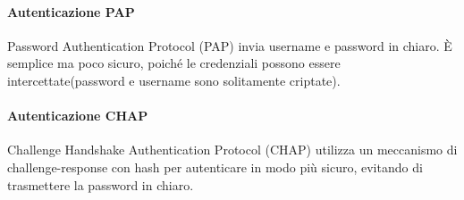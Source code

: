     \paragraph{Autenticazione PAP} 
    Password Authentication Protocol (PAP) invia username e password in chiaro. È semplice ma poco sicuro, poiché le credenziali possono essere intercettate(password e username sono solitamente criptate).

    \paragraph{Autenticazione CHAP} 
    Challenge Handshake Authentication Protocol (CHAP) utilizza un meccanismo di challenge-response con hash per autenticare in modo più sicuro, evitando di trasmettere la password in chiaro.


